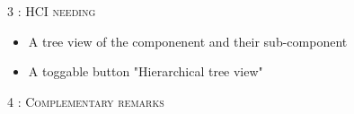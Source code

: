 \begin{flushleft}
    \BlackLine
    \textsc{\Large 3 : HCI needing}\\[0.3cm]

    \begin{itemize}
        \item A tree view of the componenent and their sub-component
        \item A toggable button "Hierarchical tree view"
    \end{itemize}

    \BlackLine
    \textsc{\Large 4 : Complementary remarks}\\[0.3cm]

\end{flushleft}
